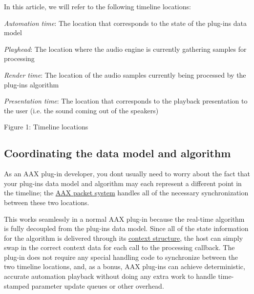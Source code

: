 In this article, we will refer to the following timeline locations\+: \begin{DoxyItemize}
\item {\itshape Automation time}\+: The location that corresponds to the state of the plug-\/in\textquotesingle{}s data model \item {\itshape Playhead}\+: The location where the audio engine is currently gathering samples for processing \item {\itshape Render time}\+: The location of the audio samples currently being processed by the plug-\/in\textquotesingle{}s algorithm \item {\itshape Presentation time}\+: The location that corresponds to the playback presentation to the user (i.\+e. the sound coming out of the speakers)\end{DoxyItemize}
 Figure 1\+: Timeline locations\hypertarget{a00351_parameterUpdateTiming_synchronization}{}\subsection{Coordinating the data model and algorithm}\label{a00351_parameterUpdateTiming_synchronization}
As an A\+A\+X plug-\/in developer, you don\textquotesingle{}t usually need to worry about the fact that your plug-\/in\textquotesingle{}s data model and algorithm may each represent a different point in the timeline; the \hyperlink{a00327_alg_comm}{A\+A\+X packet system} handles all of the necessary synchronization between these two locations.

This works seamlessly in a normal A\+A\+X plug-\/in because the real-\/time algorithm is fully decoupled from the plug-\/in\textquotesingle{}s data model. Since all of the state information for the algorithm is delivered through its \hyperlink{a00327_alg_memmgmt}{context structure}, the host can simply swap in the correct context data for each call to the processing callback. The plug-\/in does not require any special handling code to synchronize between the two timeline locations, and, as a bonus, A\+A\+X plug-\/ins can achieve deterministic, accurate automation playback without doing any extra work to handle time-\/stamped parameter update queues or other overhead.

